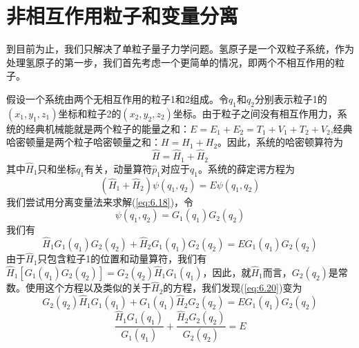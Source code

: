 \section{非相互作用粒子和变量分离}
\label{sec:6.2 Noninteracting Particles and Separation of Variables}
    到目前为止，我们只解决了单粒子量子力学问题。氢原子是一个双粒子系统，作为处理氢原子的第一步，我们首先考虑一个更简单的情况，即两个不相互作用的粒子。

    假设一个系统由两个无相互作用的粒子1和2组成。令$q_1$和$q_2$分别表示粒子1的$\left(x_1,y_1,z_1\right)$坐标和粒子2的$\left(x_2,y_2,z_2\right)$坐标。由于粒子之间没有相互作用力，系统的经典机械能就是两个粒子的能量之和：$E = E_1+E_2 = T_1+V_1 + T_2 + V_2$,经典哈密顿量是两个粒子哈密顿量之和：$H = H_1 + H_2$。因此，系统的哈密顿算符为
    \begin{equation*}
        \hat{H} = \hat{H}_1 + \hat{H}_2
    \end{equation*}
    其中$\hat{H}_1$只和坐标$q_1$有关，动量算符$\hat{p}_1$对应于$q_1$。系统的薛定谔方程为
    \begin{equation}
        \left(\hat{H}_1 + \hat{H}_2\right)\psi\left(q_1,q_2\right) = E\psi\left(q_1,q_2\right)
        \label{eq:6.18}
    \end{equation}
    我们尝试用分离变量法来求解(\ref{eq:6.18})，令
    \begin{equation}
        \psi\left(q_1,q_2\right) = G_1\left(q_1\right)G_2\left(q_2\right)
        \label{eq:6.19}
    \end{equation}
    我们有
    \begin{equation}
        \hat{H}_1G_1\left(q_1\right)G_2\left(q_2\right) + \hat{H}_2G_1\left(q_1\right)G_2\left(q_2\right) = EG_1\left(q_1\right)G_2\left(q_2\right)
        \label{eq:6.20}
    \end{equation}
    由于$\hat{H}_1$只包含粒子1的位置和动量算符，我们有$\hat{H}_1\left[G_1\left(q_1\right)G_2\left(q_2\right)\right] = G_2\left(q_2\right)\hat{H}_1G_1\left(q_1\right)$，因此，就$\hat{H}_1$而言，$G_2\left(q_2\right)$是常数。使用这个方程以及类似的关于$\hat{H}_2$的方程，我们发现(\ref{eq:6.20})变为
    \begin{equation}
        G_2\left(q_2\right)\hat{H}_1G_1\left(q_1\right) + G_1\left(q_1\right)\hat{H}_2G_2\left(q_2\right) = EG_1\left(q_1\right)G_2\left(q_2\right)
        \label{eq:6.21}
    \end{equation}
    \begin{equation}
        \frac{\hat{H}_1G_1\left(q_1\right)}{G_1\left(q_1\right)} + \frac{\hat{H}_2G_2\left(q_2\right)}{G_2\left(q_2\right)} = E
        \label{eq:6.22}
    \end{equation}
